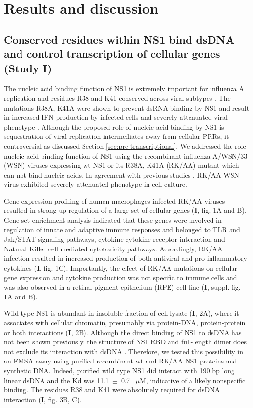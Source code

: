 
\clearpage
\section{Results and discussion}

	\subsection{Conserved residues within NS1 bind dsDNA and control transcription of cellular genes (Study I)}
	
		The nucleic acid binding function of NS1 is extremely important for influenza A replication and residues R38 and K41 conserved across viral subtypes \parencite{Hatada1992, Zohari2008}. The mutations R38A, K41A were shown to prevent dsRNA binding by NS1 and result in increased IFN production by infected cells and severely attenuated viral phenotype \parencite{Donelan2003}. Although the proposed role of nucleic acid binding by NS1 is sequestration of viral replication intermediates away from cellular \gls{PRR}s, it controversial as discussed Section \ref{sec:pre-transcriptional}. We addressed the role nucleic acid binding function of NS1 using the recombinant influenza A/WSN/33 (WSN) viruses expressing \gls{wt} NS1 or its R38A, K41A (RK/AA) mutant which can not bind nucleic acids. In agreement with previous studies \parencite{Min2006}, RK/AA WSN virus exhibited severely attenuated phenotype in cell culture. 
		
		Gene expression profiling of human macrophages infected RK/AA viruses resulted in strong up-regulation of a large set of cellular genes (\textbf{I}, fig. 1A and B). Gene set enrichment analysis \parencite{GSubramanian2005} indicated that these genes were involved in regulation of innate and adaptive immune responses and belonged to TLR and Jak/STAT signaling pathways, cytokine-cytokine receptor interaction and Natural Killer cell mediated cytotoxicity pathways. Accordingly, RK/AA infection resulted in increased production of both antiviral and pro-inflammatory cytokines (\textbf{I}, fig. 1C). Importantly, the effect of RK/AA mutations on cellular gene expression and cytokine production was not specific to immune cells and was also observed in a retinal pigment epithelium (RPE) cell line (\textbf{I}, suppl. fig. 1A and B). 
		
		Wild type NS1 is abundant in insoluble fraction of cell lysate (\textbf{I}, 2A), where it associates with cellular chromatin, presumably via protein-DNA, protein-protein or both interactions (\textbf{I}, 2B). Although the direct binding of NS1 to dsDNA has not been shown previously, the structure of NS1 RBD and full-length dimer does not exclude its interaction with dsDNA \parencite{Bornholdt2008, Cheng2009}. Therefore, we tested this possibility in an \gls{EMSA} assay using purified recombinant \gls{wt} and RK/AA NS1 proteins and synthetic DNA. Indeed, purified wild type NS1 did interact with 190 bp long linear dsDNA and the \gls{Kd} was 11.1~$\pm$~0.7~ $\mu$M, indicative of a likely nonspecific binding. The residues R38 and K41 were absolutely required for dsDNA interaction (\textbf{I}, fig. 3B, C). 
		
